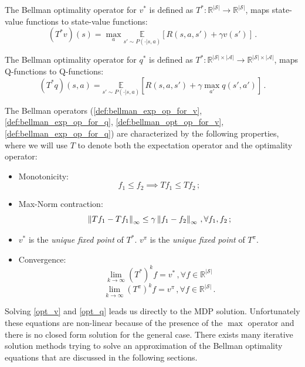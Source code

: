 \begin{definition}
	The Bellman optimality operator for $v^*$ is defined as $T^* : \mathbb{R}^{| \mathcal{S} |} \rightarrow \mathbb{R}^{| \mathcal{S} | }$, maps state-value functions to state-value functions:
	\begin{equation}
		(T^* v)(s) = \max_a \underset{s' \sim P(\cdot | s,a)}{\mathbb{E}} \left[ R(s,a,s') + \gamma v(s') \right] \, .
	\end{equation}
\end{definition} \label{def:bellman_opt_op_for_v}
\begin{definition}
	The Bellman optimality operator for $q^*$ is defined as $T^* : \mathbb{R}^{| \mathcal{S} | \times | \mathcal{A} |} \rightarrow \mathbb{R}^{| \mathcal{S} | \times | \mathcal{A} |}$, maps Q-functions to Q-functions:
	\begin{equation}
		(T^* q)(s,a) =\underset{s' \sim P(\cdot | s,a)}{
			\mathbb{E}} \left[ R(s,a,s') + \gamma \max_{a'} q(s',a') \right] \, .
	\end{equation}
\end{definition} \label{def:bellman_exp_op_for_v}
The Bellman operators (\ref{def:bellman_exp_op_for_v}, \ref{def:bellman_exp_op_for_q}, \ref{def:bellman_opt_op_for_v}, \ref{def:bellman_exp_op_for_q}) are characterized by the following properties, where we will use $T$ to denote both the expectation operator and the optimality operator:
\begin{itemize}
	\item Monotonicity: \begin{equation}
			f_1 \leq f_2 \implies T f_1 \leq T f_2 \, ;
		\end{equation}
	\item Max-Norm contraction:
			\begin{equation}
			\left\lVert T f_1 - T f_1\right\rVert_\infty \leq \gamma \left\lVert f_1 - f_2\right\rVert_\infty \, , \forall f_1, f_2 \, ;
		\end{equation}
	\item $v^*$ is the \textit{unique fixed point} of $T^*$. $v^\pi$ is the \textit{unique fixed point} of $T^{\pi}$.
	\item Convergence: 
	 \begin{equation}
			\lim_{k \rightarrow \infty} (T^*)^k f = v^* \, , \forall f \in \mathbb{R}^{| \mathcal{S} |} \, 
		\end{equation}
		\begin{equation}
			\lim_{k \rightarrow \infty} (T^{\pi})^k f = v^\pi \, , \forall f \in \mathbb{R}^{| \mathcal{S} |} \, .
		\end{equation}
\end{itemize}
Solving \cref{opt_v} and \cref{opt_q} leads us directly to the MDP solution. Unfortunately these equations are non-linear because of the presence of the $\max$ operator and there is no closed form solution for the general case. 
There exists many iterative solution methods trying to solve an approximation of the Bellman optimality equations that are discussed in the following sections.


